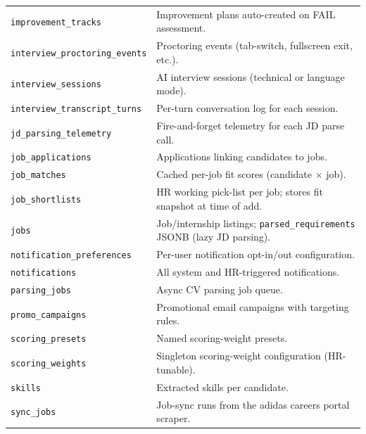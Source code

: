 \begin{longtable}{@{}l p{9cm}@{}}
	\texttt{improvement\_tracks}         & Improvement plans auto-created on FAIL assessment. \\
	\texttt{interview\_proctoring\_events} & Proctoring events (tab-switch, fullscreen exit, etc.). \\
	\texttt{interview\_sessions}         & AI interview sessions (technical or language mode). \\
	\texttt{interview\_transcript\_turns}& Per-turn conversation log for each session. \\
	\texttt{jd\_parsing\_telemetry}      & Fire-and-forget telemetry for each JD parse call. \\
	\texttt{job\_applications}           & Applications linking candidates to jobs. \\
	\texttt{job\_matches}                & Cached per-job fit scores (candidate $\times$ job). \\
	\texttt{job\_shortlists}             & HR working pick-list per job; stores fit snapshot at time of add. \\
	\texttt{jobs}                        & Job/internship listings; \texttt{parsed\_requirements} JSONB (lazy JD parsing). \\
	\texttt{notification\_preferences}   & Per-user notification opt-in/out configuration. \\
	\texttt{notifications}               & All system and HR-triggered notifications. \\
	\texttt{parsing\_jobs}               & Async CV parsing job queue. \\
	\texttt{promo\_campaigns}            & Promotional email campaigns with targeting rules. \\
	\texttt{scoring\_presets}            & Named scoring-weight presets. \\
	\texttt{scoring\_weights}            & Singleton scoring-weight configuration (HR-tunable). \\
	\texttt{skills}                      & Extracted skills per candidate. \\
	\texttt{sync\_jobs}                  & Job-sync runs from the adidas careers portal scraper. \\

\end{longtable}
